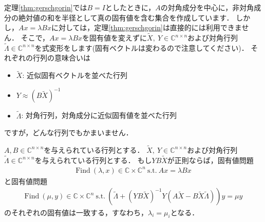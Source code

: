 定理\ref{thm:gerschgorin}では$B = I$としたときに，$A$の対角成分を中心に，非対角成分の絶対値の和を半径として真の固有値を含む集合を作成しています．
しかし，$Ax = \lambda B x$に対しては，定理\ref{thm:gerschgorin}は直接的には利用できません．
そこで，$A x = \lambda B x$を固有値を変えずに$\tilde{X}, ~ Y \in {\mathbb C}^{n \times n}$および対角行列$\tilde{\Lambda} \in {\mathbb C}^{n \times n}$を式変形をします(固有ベクトルは変わるので注意してください)．
それぞれの行列の意味合いは
\begin{itemize}
	\item $\tilde{X}$: 近似固有ベクトルを並べた行列
	\item $Y \approx (B \tilde{X})^{-1}$
	\item $\tilde{\Lambda}$: 対角行列，対角成分に近似固有値を並べた行列
\end{itemize}
ですが，どんな行列でもかまいません．


\begin{Lem}\label{lem:trans_eigenvalue}
	$A, B \in {\mathbb C}^{n \times n}$を与えられている行列とする．
	$\tilde{X}, ~ Y \in {\mathbb C}^{n \times n}$および対角行列$\tilde{\Lambda} \in {\mathbb C}^{n \times n}$を与えられている行列とする．
	もし$Y B \tilde{X}$が正則ならば，固有値問題
	\begin{align*}
		\mbox{Find} ~ (\lambda, x) \in {\mathbb C} \times {\mathbb C}^n ~ \mbox{s.t.} ~ A x = \lambda B x
	\end{align*}
	と固有値問題
	\begin{align*}
		\mbox{Find} ~ (\mu, y) \in {\mathbb C} \times {\mathbb C}^n ~ \mbox{s.t.} ~ \left( \tilde{\Lambda} + (Y B \tilde{X})^{-1} Y ( A \tilde{X} - B \tilde{X} \tilde{\Lambda} )  \right) y = \mu y
	\end{align*}
	のそれぞれの固有値は一致する，すなわち，$\lambda_i = \mu_i$となる．
\end{Lem}

